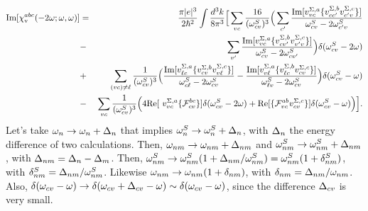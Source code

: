\documentclass[floatfix,prb,aps,superscriptaddress,11pt]{revtex4}
\begin{document}
\begin{eqnarray}
\mbox{Im}\lbrack \chi _{\mathrm{v}}^{abc}(-2\omega;\omega,\omega)] &=&\frac{\pi
|e|^{3}}{2\hbar ^{2}}\int \frac{d^{3}k}{8\pi ^{3}}\Big[\sum_{vc}\frac{16}{(
\omega_{cv}^{S})^{3}}\Big(\sum_{c^{\prime }}\frac{\mbox{Im}\lbrack
v_{vc}^{\Sigma ,a}\{v_{cc^{\prime }}^{\Sigma ,b}v_{c^{\prime }v}^{\Sigma
,c}\}]}{\omega_{cv}^{S}-2\omega_{c^{\prime }v}^{S}}  \notag  \label{imchicf} \\
&-&\sum_{v^{\prime }}\frac{\mbox{Im}\lbrack v_{vc}^{\Sigma
,a}\{v_{cv^{\prime }}^{\Sigma ,b}v_{v^{\prime }v}^{\Sigma ,c}\}]}{\omega
_{cv}^{S}-2\omega_{cv^{\prime }}^{S}}\Big)\delta(\omega_{cv}^{S}-2\omega)  \notag \\
&+&\sum_{(vc)\neq\ell }
\frac{1}{(\omega_{cv}^{S})^{3}}\Big(\frac{\mbox{Im}\lbrack
v_{\ell c}^{\Sigma ,a}\{v_{cv}^{\Sigma ,b}v_{v\ell }^{\Sigma ,c}\}]}{\omega
_{c\ell }^{S}-2\omega_{cv}^{S}}-
\frac{\mbox{Im}\lbrack v_{v\ell }^{\Sigma
,a}\{v_{\ell c}^{\Sigma ,b}v_{cv}^{\Sigma ,c}\}]}{\omega_{\ell v}^{S}-2\omega
_{cv}^{S}}\Big)\delta(\omega_{cv}^{S}-\omega)  \notag \\
&-&\sum_{vc}\frac{1}{(\omega_{cv}^{S})^{3}}\Big(4\mbox{Re}\lbrack \
v_{vc}^{\Sigma ,a}\{\mathcal{F}_{cv}^{bc}\}]\delta(\omega_{cv}^{S}-2\omega)+\mbox{Re}
\lbrack \{\mathcal{F}_{vc}^{ab}v_{cv}^{\Sigma ,c}\}]\delta(\omega_{cv}^{S}-\omega)
\Big)\Big].
\end{eqnarray}
Let's take $\omega_n\to\omega_n+\Delta_n$ that implies
$\omega^S_n\to\omega^S_n+\Delta_n$, with $\Delta_n$  
the energy difference of two calculations.
Then, $\omega_{nm}\to\omega_{nm}+\Delta_{nm}$ and
$\omega^S_{nm}\to\omega^S_{nm}+\Delta_{nm}$, with $\Delta_{nm}=\Delta_n-\Delta_m$.
Then,  
$\omega^S_{nm}\to\omega^S_{nm}(1+\Delta_{nm}/\omega^S_{nm})=\omega^S_{nm}(1+\delta^S_{nm})$,  
with $\delta^S_{nm}=\Delta_{nm}/\omega^S_{nm}$.  
Likewise
$\omega_{nm}\to\omega_{nm}(1+\delta_{nm})$, 
with $\delta_{nm}=\Delta_{nm}/\omega_{nm}$. 
Also, $\delta(\omega_{cv}-\omega)
\to \delta(\omega_{cv}+\Delta_{cv}-\omega)\sim \delta(\omega_{cv}-\omega)$, since the
difference $\Delta_{cv}$ is very small.
\end{document}

